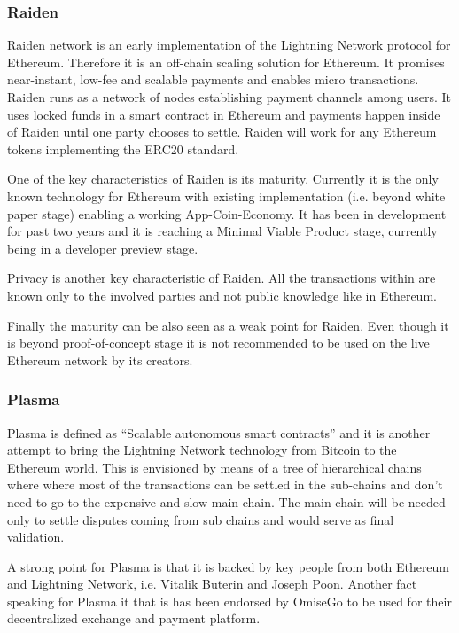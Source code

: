\subsubsection{Raiden}
Raiden network is an early implementation of the Lightning Network protocol for Ethereum. Therefore it is an off-chain scaling solution for Ethereum. It promises near-instant, low-fee and scalable payments and enables micro transactions. Raiden runs as a network of nodes establishing payment channels among users. It uses locked funds in a smart contract in Ethereum and payments happen inside of Raiden until one party chooses to settle. Raiden will work for any Ethereum tokens implementing the ERC20 standard.

One of the key characteristics of Raiden is its maturity. Currently it is the only known technology for Ethereum with existing implementation (i.e. beyond white paper stage) enabling a working App-Coin-Economy. It has been in development for past two years and it is reaching a Minimal Viable Product stage, currently being in a developer preview stage.

Privacy is another key characteristic of Raiden.  All the transactions within are known only to the involved parties and not public knowledge like in Ethereum.

Finally the maturity can be also seen as a weak point for Raiden. Even though it is beyond proof-of-concept stage it is not recommended to be used on the live Ethereum network by its creators.

\subsubsection{Plasma}
Plasma is defined as “Scalable autonomous smart contracts” and it is another attempt to bring the Lightning Network technology from Bitcoin to the Ethereum world. This is envisioned by means of a tree of hierarchical chains where where most of the transactions can be settled in the sub-chains and don’t need to go to the expensive and slow main chain. The main chain will be needed only to settle disputes coming from sub chains and would serve as final validation.

A strong point for Plasma is that it is backed by key people from both Ethereum and Lightning Network, i.e. Vitalik Buterin and Joseph Poon. Another fact speaking for Plasma it that is has been endorsed by OmiseGo to be used for their decentralized exchange and payment platform\cite{omisego_plasma}.

